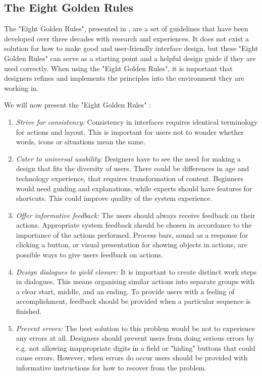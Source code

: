 \subsection{The Eight Golden Rules}
\label{subsec:golden}
The "Eight Golden Rules", presented in \cite{mmi}, are a set of guidelines that have been developed over three decades with research and experiences. It does not exist a solution for how to make good and user-friendly interface design, but these "Eight Golden Rules" can serve as a starting point and a helpful design guide if they are used correctly. When using the "Eight Golden Rules", it is important that designers refines and implements the principles into the environment they are working in. 

We will now present the "Eight Golden Rules" \cite{mmi}:

\begin{enumerate}[{e}.1] 
\item \emph{Strive for consistency:} Consistency in interfaces requires identical terminology for actions and layout. This is important for users not to wonder whether words, icons or situations mean the same. 
\item \emph{Cater to universal usability:} Designers have to see the need for making a design that fits the diversity of users. There could be differences in age and technology experience, that requires transformation of content. Beginners would need guiding and explanations, while experts should have features for shortcuts. This could improve quality of the system experience. 
\item \emph{Offer informative feedback:} The users should always receive feedback on their actions. Appropriate system feedback should be chosen in accordance to the importance of the actions performed. Process bars, sound as a response for clicking a button, or visual presentation for showing objects in actions, are possible ways to give users feedback on actions.  
\item \emph{Design dialogues to yield closure:} It is important to create distinct work steps in dialogues. This means organising similar actions into separate groups with a clear start, middle, and an ending. To provide users with a feeling of accomplishment, feedback should be provided when a particular sequence is finished.     
\item \emph{Prevent errors:} The best solution to this problem would be not to experience any errors at all. Designers should prevent users from doing serious errors by e.g. not allowing inappropriate digits in a field or "hiding" buttons that could cause errors. However, when errors do occur users should be provided with informative instructions for how to recover from the problem.   

\end{enumerate}
